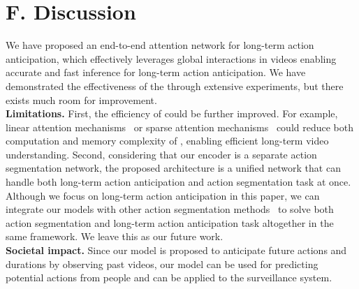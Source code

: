 
\vspace{-1mm}
\section*{F. Discussion}
We have proposed an end-to-end attention network for long-term action anticipation, which effectively leverages global interactions in videos enabling accurate and fast inference for long-term action anticipation. We have demonstrated the effectiveness of the \ours through extensive experiments, but there exists much room for improvement. 
\\
\textbf{Limitations.}
First, the efficiency of \ours could be further improved. For example, linear attention mechanisms~\cite{katharopoulos2020transformers, wang2020linformer, choromanski2020rethinking} or sparse attention mechanisms~\cite{beltagy2020longformer,zaheer2020big} could reduce both computation and memory complexity of \ours, enabling efficient long-term video understanding.
Second, considering that our encoder is a separate action segmentation network, the proposed architecture is a unified network that can handle both long-term action anticipation and action segmentation task at once.
Although we focus on long-term action anticipation in this paper, we can integrate our models with other action segmentation methods~\cite{lea2017temporal,wang2020boundary,ishikawa2021alleviating,farha2019ms,yi2021asformer} to solve both action segmentation and long-term action anticipation task altogether in the same framework.
We leave this as our future work.
\\
\textbf{Societal impact.} Since our model is proposed to anticipate future actions and durations by observing past videos, our model can be used for predicting potential actions from people and can be applied to the surveillance system.



\vspace{40mm}
